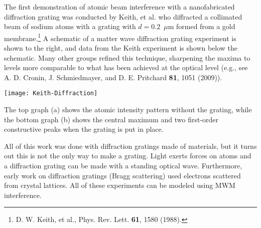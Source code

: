 The first demonstration of atomic beam interference with a nanofabricated diffraction grating was conducted by Keith, et al.  who diffracted a collimated beam of sodium atoms with a grating with $d = 0.2$~$\mu$m formed from a gold membrane.\footnote{D. W. Keith, et al., Phys. Rev. Lett. {\bf 61}, 1580 (1988).}  A schematic of a matter wave diffraction grating experiment is shown to the right, and data from the Keith experiment is shown below the schematic. 
Many other groups refined this technique, sharpening the maxima to levels more comparable to what has been achieved at the optical level (e.g., see  A. D. Cronin, J. Schmiedmayer, and D. E. Pritchard {\bf 81}, 1051 (2009)).
%
\begin{marginfigure}
\texttt{[image: Keith-Diffraction]}
\caption{The top graph (a) shows the atomic intensity pattern without the grating, while the bottom graph (b) shows the central maximum and two first-order constructive peaks when the grating is put in place.}
\end{marginfigure}


All of this work was done with diffraction gratings made of materials, but it turns out this is not the only way to make a grating.  Light exerts forces on atoms and a diffraction grating can be made with a standing optical wave. Furthermore, early work on diffraction gratings (\ie Bragg scattering) used electrons scattered from crystal lattices. All of these experiments can be modeled using MWM interference.

